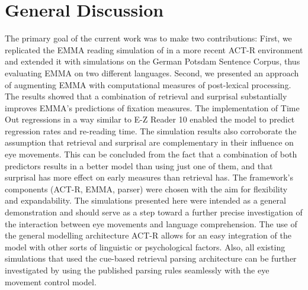 \documentclass{cambridge7A}\usepackage[]{graphicx}\usepackage[]{color}
\begin{document}
\section{General Discussion}
The primary goal of the current work was to make two contributions:
First, we replicated the EMMA reading simulation of \cite{Salvucci2001} in a more recent ACT-R environment and extended it with simulations on the German Potsdam Sentence Corpus, thus evaluating EMMA on two different languages. 
Second, we presented an approach of augmenting EMMA with computational measures of post-lexical processing.  The results showed that a combination of retrieval and surprisal substantially improves EMMA's predictions of fixation measures.  The implementation of Time Out regressions \citep{MitchellEtAl2008} in a way similar to E-Z Reader 10 enabled the model to predict regression rates and re-reading time. 
The simulation results also corroborate the assumption that retrieval and surprisal are complementary in their influence on eye movements.  This can be concluded from the fact that a combination of both predictors results in a better model than using just one of them, and that surprisal has more effect on early measures than retrieval has.
The framework's components (ACT-R, EMMA, parser) were chosen with the aim for flexibility and expandability.  The simulations presented here were intended as a general demonstration and should serve as a step toward a further precise investigation of the interaction between eye movements and language comprehension.  The use of the general modelling architecture ACT-R allows for an easy integration of the model with other sorts of linguistic or psychological factors.  Also, all existing simulations that used the cue-based retrieval parsing architecture \citep[e.g.,][]{LewisVasishth2005,VasishthLewis2006,VasishthBruessowLewis2008} can be further investigated by using the published parsing rules seamlessly with the eye movement control model.  
\end{document}
